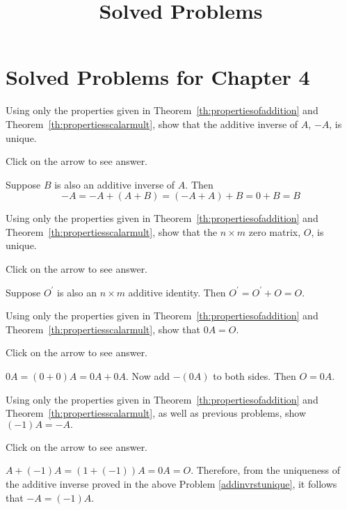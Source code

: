 \documentclass{ximera}
\title{Solved Problems} \license{CC BY-NC-SA 4.0}
\begin{document}
\begin{abstract}
\end{abstract}
\maketitle

\section*{Solved Problems for Chapter 4}

\begin{problem}\label{prb:4.5} Using only the properties given in Theorem~\ref{th:propertiesofaddition}
 and Theorem~\ref{th:propertiesscalarmult},
show that the additive inverse of $A$, $-A$, is unique.

Click on the arrow to see answer.
\begin{expandable}{}{}
 Suppose $B$ is also an additive inverse of $A$. Then
\[
-A=-A+\left( A+B\right) =\left( -A+A\right) +B=0+B=B
\]
\end{expandable}
\end{problem}

\begin{problem}\label{prb:4.6} Using only the properties given in Theorem~\ref{th:propertiesofaddition}
 and Theorem~\ref{th:propertiesscalarmult},
show that the $n\times m$ zero matrix, $O$, is unique.

Click on the arrow to see answer.
\begin{expandable}{}{}
Suppose $O^{\prime }$ is also an $n\times m$ additive identity. Then $O^{\prime }=O^{\prime }+O=O.$
\end{expandable}
\end{problem}

\begin{problem}\label{prb:4.7} Using only the properties given in Theorem~\ref{th:propertiesofaddition}
 and Theorem~\ref{th:propertiesscalarmult}, show that $0A=O.$ 

Click on the arrow to see answer.
\begin{expandable}{}{}
$0A=\left( 0+0\right) A=0A+0A.$ Now add $-\left(
0A\right) $ to both sides. Then $O=0A$.
\end{expandable}
\end{problem}

\begin{problem}\label{prb:4.8} Using only the properties given in Theorem~\ref{th:propertiesofaddition}
 and Theorem~\ref{th:propertiesscalarmult}, as well as previous
problems, show $\left( -1\right) A=-A.$

Click on the arrow to see answer.
\begin{expandable}{}{}
$A+\left( -1\right) A=\left( 1+\left(
-1\right) \right) A=0A=O.$ Therefore, from the uniqueness of the additive
inverse proved in the above Problem \ref{addinvrstunique}, it follows that $
-A=\left( -1\right) A$.
\end{expandable}
\end{problem}
\end{document}
